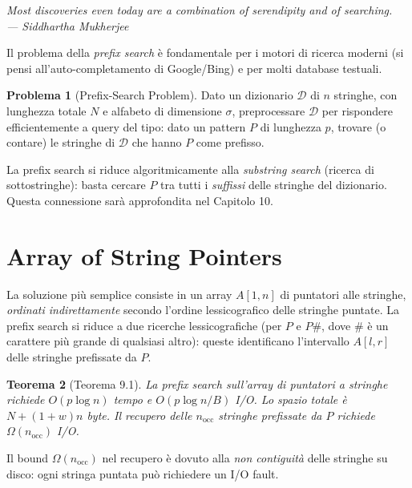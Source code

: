 \documentclass[12pt, a4paper, oneside]{book}
\theoremstyle{plain}
\newtheorem{teorema}{Teorema}[chapter]
\theoremstyle{definition}
\newtheorem{problema}[teorema]{Problema}
\theoremstyle{remark}
\begin{document}
\begin{flushright}
\itshape Most discoveries even today are a combination of serendipity and of searching.\\
--- Siddhartha Mukherjee
\end{flushright}

\bigskip

Il problema della \emph{prefix search} è fondamentale per i motori di ricerca moderni (si pensi all'auto-completamento di Google/Bing) e per molti database testuali.

\begin{problema}[Prefix-Search Problem]
Dato un dizionario $\mathcal{D}$ di $n$ stringhe, con lunghezza totale $N$ e alfabeto di dimensione $\sigma$, preprocessare $\mathcal{D}$ per rispondere efficientemente a query del tipo: dato un pattern $P$ di lunghezza $p$, trovare (o contare) le stringhe di $\mathcal{D}$ che hanno $P$ come prefisso.
\end{problema}

La prefix search si riduce algoritmicamente alla \emph{substring search} (ricerca di sottostringhe): basta cercare $P$ tra tutti i \emph{suffissi} delle stringhe del dizionario. Questa connessione sarà approfondita nel Capitolo 10.

\section{Array of String Pointers}

La soluzione più semplice consiste in un array $A[1,n]$ di puntatori alle stringhe, \emph{ordinati indirettamente} secondo l'ordine lessicografico delle stringhe puntate. La prefix search si riduce a due ricerche lessicografiche (per $P$ e $P\#$, dove $\#$ è un carattere più grande di qualsiasi altro): queste identificano l'intervallo $A[l,r]$ delle stringhe prefissate da $P$.

\begin{teorema}[Teorema 9.1]
La prefix search sull'array di puntatori a stringhe richiede $O(p\log n)$ tempo e $O(p\log n / B)$ I/O. Lo spazio totale è $N + (1+w)n$ byte. Il recupero delle $n_{\mathrm{occ}}$ stringhe prefissate da $P$ richiede $\Omega(n_{\mathrm{occ}})$ I/O.
\end{teorema}

Il bound $\Omega(n_{\mathrm{occ}})$ nel recupero è dovuto alla \emph{non contiguità} delle stringhe su disco: ogni stringa puntata può richiedere un I/O fault.
\end{document}
